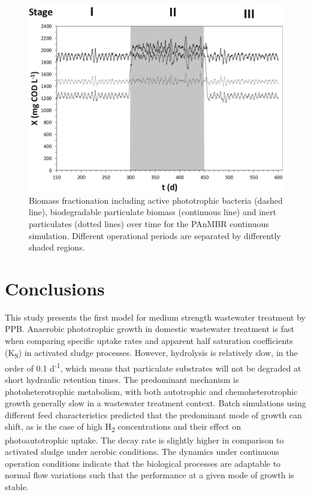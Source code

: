 \begin{figure}[H]
    \centering
    \includegraphics[width=1\linewidth,height=\textheight,keepaspectratio]{./Chap2/simulations/dynamic_particulates.jpg}
    \caption{Biomass fractionation including active phototrophic bacteria (dashed line), biodegradable particulate biomass (continuous line) and inert particulates (dotted lines) over time for the PAnMBR continuous simulation. Different operational periods are separated by differently shaded regions.}
    \label{fig:ch2_dyn_bio}
\end{figure}

\section{Conclusions}
This study presents the first model for medium strength wastewater treatment by PPB.
Anaerobic phototrophic growth in domestic wastewater treatment is fast when comparing specific uptake rates and apparent half saturation coefficients (K\textsubscript{S}) in activated sludge processes. 
However, hydrolysis is relatively slow, in the order of 0.1 d\textsuperscript{-1}, which means that particulate substrates will not be degraded at short hydraulic retention times. 
The predominant mechanism is photoheterotrophic metabolism, with both autotrophic and chemoheterotrophic growth generally slow in a wastewater treatment context. 
Batch simulations using different feed characteristics predicted that the predominant mode of growth can shift, as is the case of high H\textsubscript{2} concentrations and their effect on photoautotrophic uptake. 
The decay rate is slightly higher in comparison to activated sludge under aerobic conditions. 
The dynamics under continuous operation conditions indicate that the biological processes are adaptable to normal flow variations such that the performance at a given mode of growth is stable. 

